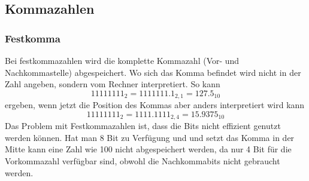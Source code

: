 \documentclass[a4paper]{scrartcl}
\begin{document}
        \subsection{Kommazahlen}
        \subsubsection{Festkomma}
            Bei festkommazahlen wird die komplette Kommazahl (Vor- und Nachkommastelle) abgespeichert. Wo sich das Komma befindet wird nicht in der Zahl angeben, sondern vom Rechner 
            interpretiert. So kann
            \begin{equation}
                11111111_2 = 1111111.1_{2,1}  = 127.5_{10}
            \end{equation}
            ergeben, wenn jetzt die Position des Kommas aber anders interpretiert wird kann
            \begin{equation}
                11111111_2 = 1111.1111_{2,4} = 15.9375_{10}        
            \end{equation}
            Das Problem mit Festkommazahlen ist, dass die Bits nicht effizient genutzt werden können. Hat man 8 Bit zu Verfügung und und setzt das Komma in der Mitte kann eine 
            Zahl wie 100 nicht abgespeichert werden, da nur 4 Bit für die Vorkommazahl verfügbar sind, obwohl die Nachkommabits nicht gebraucht werden.
\end{document}
